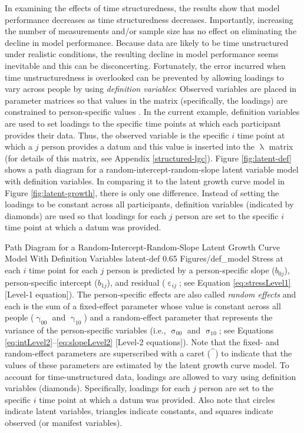 \documentclass[
12pt, %
twoside,
english]{guelphthesis}
\begin{document}
In examining the effects of time structuredness, the results show that model performance decreases as time structuredness decreases. Importantly, increasing the number of measurements and/or sample size has no effect on eliminating the decline in model performance. Because data are likely to be time unstructured under realistic conditions, the resulting decline in model performance seems inevitable and this can be disconcerting. Fortunately, the error incurred when time unstructuredness is overlooked can be prevented by allowing loadings to vary across people by using \emph{definition variables}: Observed variables are placed in parameter matrices so that values in the matrix (specifically, the loadings) are constrained to person-specific values \autocite{mehta2000,mehta2005,blozis2008,sterba2014}. In the current example, definition variables are used to set loadings to the specific time points at which each participant provides their data. Thus, the observed variable is the specific \(i\) time point at which a \(j\) person provides a datum and this value is inserted into the \(\uplambda\) matrix (for details of this matrix, see Appendix \ref{structured-lgc}). Figure \ref{fig:latent-def} shows a path diagram for a random-intercept-random-slope latent variable model with definition variables. In comparing it to the latent growth curve model in Figure \ref{fig:latent-growth}, there is only one difference. Instead of setting the loadings to be constant across all participants, definition variables (indicated by diamonds) are used so that loadings for each \(j\) person are set to the specific \(i\) time point at which a datum was provided.
\begin{apaFigure}
[portrait]
[samepage]
[-0.2cm]
{Path Diagram for a Random-Intercept-Random-Slope Latent Growth Curve Model With Definition Variables}
{latent-def}
{0.65}
{Figures/def_model}
{Stress at each $i$ time point for each $j$ person is predicted by a person-specific slope ($b_{0j}$), person-specific intercept ($b_{1j}$), and residual ($\upepsilon_{ij}$; see Equation \ref{eq:stressLevel1} [Level-1 equation]). The person-specific effects are also called \textit{random effects} and each is the sum of a fixed-effect parameter whose value is constant across all people ($\upgamma_{00}$ and $\upgamma_{10}$) and a random-effect parameter that represents the variance of the person-specific variables (i.e., $\upsigma_{00}$ and $\upsigma_{10}$; see Equations \ref{eq:intLevel2}--\ref{eq:slopeLevel2} [Level-2 equations]). Note that the fixed- and random-effect parameters are superscribed with a caret ($\hat{\phantom{\beta}}$) to indicate that the values of these parameters are estimated by the latent growth curve model. To account for time-unstructured data, loadings are allowed to vary using definition variables (diamonds). Specifically, loadings for each $j$ person are set to the specific $i$ time point at which a datum was provided. Also note that circles indicate latent variables, triangles indicate constants, and squares indicate observed (or manifest variables).}
\end{apaFigure}
\end{document}
